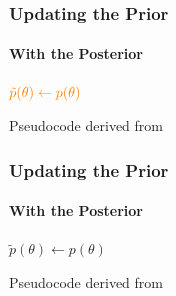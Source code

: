\documentclass[9pt, aspectratio=169]{beamer}
\begin{document}
\begin{frame}
\frametitle{Updating the Prior}
\framesubtitle{With the Posterior}
\begin{algorithm}[H]
	$\color{orange}\tilde{p}(\theta) \leftarrow p(\theta)$\\
\end{algorithm}
\vspace{35pt}
\tiny Pseudocode derived from \cite{papamakarios2016fast}
\end{frame} 
\begin{frame}
\frametitle{Updating the Prior}
\framesubtitle{With the Posterior}
\begin{algorithm}[H]
	$\tilde{p}(\theta) \leftarrow p(\theta)$\\
\end{algorithm}
\vspace{35pt}
\tiny Pseudocode derived from \cite{papamakarios2016fast}
\end{frame} 
\end{document}
